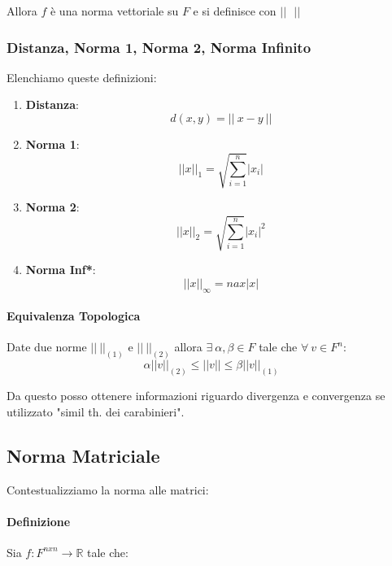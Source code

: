 \documentclass{article}
\begin{document}
Allora $f$ è una norma vettoriale su $F$ e si definisce con $\boxed{|| \:\:\:||}$

\subsubsection{Distanza, Norma 1, Norma 2, Norma Infinito}

Elenchiamo queste definizioni:

\begin{enumerate}
    \item \textbf{Distanza}:
    \[ d(x,y) = || \: x - y \:|| \]
    \item \textbf{Norma 1}:
    \vspace*{8px}
    \[ || x ||_{1} = \sqrt{\sum^{n}_{i=1}}|x_{i}| \]
    \vspace*{4px}
    \item \textbf{Norma 2}:
    \vspace*{8px}
    \[ || x ||_{2} = \sqrt{\sum^{n}_{i=1}}|x_{i}|^2 \]
    \vspace*{4px}
    \item \textbf{Norma Inf*}:
    \vspace*{8px}
    \[ || x ||_{\infty} = nax|x| \]
    \vspace*{4px}
\end{enumerate}

\newpage

\paragraph{Equivalenza Topologica} Date due norme $||\:||_{(1)}$ e $||\:||_{(2)}$ allora $\exists \: \alpha,\beta \in F$ tale che $\forall \: v \in F^{n}$:
\[ \alpha||v||_{(2)} \leq ||v|| \leq \beta||v||_{(1)}\]

Da questo posso ottenere informazioni riguardo divergenza e convergenza se utilizzato "simil th. dei carabinieri".

\subsection{Norma Matriciale}

Contestualizziamo la norma alle matrici:

\paragraph{Definizione} Sia $f: F^{nxn} \xrightarrow{} \mathbb{R}$ tale che:
\end{document}
